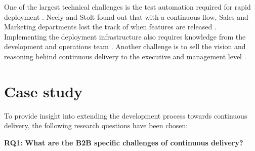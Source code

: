 \documentclass[lnbip]{svmultln}
\begin{document}
One of the largest technical challenges is the test automation required for rapid deployment \cite{cdbook, humble2006deployment}. Neely and Stolt found out that with a continuous flow, Sales and Marketing departments lost the track of when features are released \cite{neely2013continuous}. Implementing the deployment infrastructure also requires knowledge from the development and operations team \cite{humble2006deployment}. Another challenge is to sell the vision and reasoning behind continuous delivery to the executive and management level \cite{neely2013continuous}.


\section{Case study}
To provide insight into extending the development process towards continuous delivery, the following research questions have been chosen: \newline


\noindent \textbf{RQ1: What are the B2B specific challenges of continuous delivery?}
\end{document}

